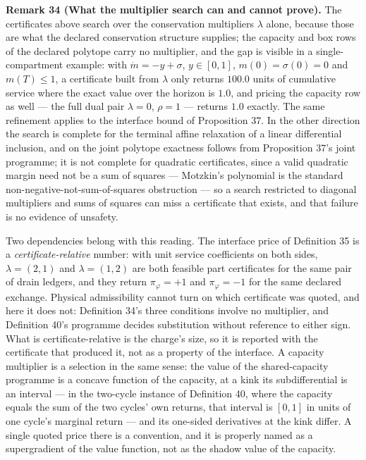 \documentclass[11pt]{article}
\begin{document}
\textbf{Remark 34 (What the multiplier search can and cannot prove).} The certificates above search over the conservation multipliers \(\lambda\) alone, because those are what the declared conservation structure supplies; the capacity and box rows of the declared polytope carry no multiplier, and the gap is visible in a single-compartment example: with \(\dot m = -y + \sigma\), \(y \in [0, 1]\), \(m(0) = \sigma(0) = 0\) and \(m(T) \le 1\), a certificate built from \(\lambda\) only returns \(100.0\) units of cumulative service where the exact value over the horizon is \(1.0\), and pricing the capacity row as well --- the full dual pair \(\lambda = 0\), \(\rho = 1\) --- returns \(1.0\) exactly. The same refinement applies to the interface bound of Proposition 37. In the other direction the search is complete for the terminal affine relaxation of a linear differential inclusion, and on the joint polytope exactness follows from Proposition 37's joint programme; it is not complete for quadratic certificates, since a valid quadratic margin need not be a sum of squares --- Motzkin's polynomial is the standard non-negative-not-sum-of-squares obstruction --- so a search restricted to diagonal multipliers and sums of squares can miss a certificate that exists, and that failure is no evidence of unsafety.

Two dependencies belong with this reading. The interface price of Definition 35 is a \emph{certificate-relative} number: with unit service coefficients on both sides, \(\lambda = (2,1)\) and \(\lambda = (1,2)\) are both feasible part certificates for the same pair of drain ledgers, and they return \(\pi_\varphi = +1\) and \(\pi_\varphi = -1\) for the same declared exchange. Physical admissibility cannot turn on which certificate was quoted, and here it does not: Definition 34's three conditions involve no multiplier, and Definition 40's programme decides substitution without reference to either sign. What is certificate-relative is the charge's size, so it is reported with the certificate that produced it, not as a property of the interface. A capacity multiplier is a selection in the same sense: the value of the shared-capacity programme is a concave function of the capacity, at a kink its subdifferential is an interval --- in the two-cycle instance of Definition 40, where the capacity equals the sum of the two cycles' own returns, that interval is \([0, 1]\) in units of one cycle's marginal return --- and its one-sided derivatives at the kink differ. A single quoted price there is a convention, and it is properly named as a supergradient of the value function, not as the shadow value of the capacity.
\end{document}
